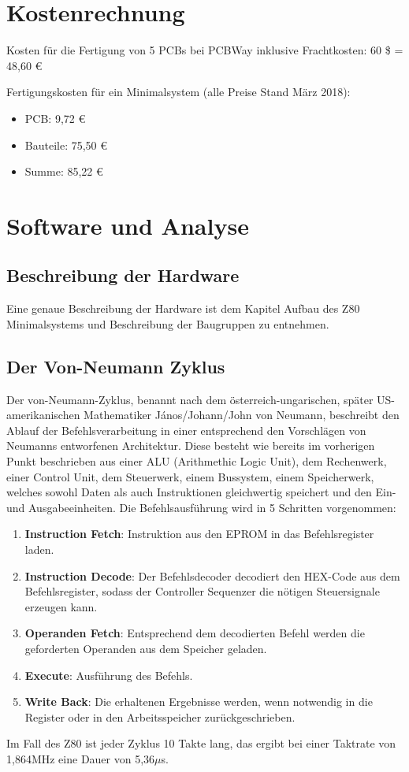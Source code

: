 \section{Kostenrechnung}
\label{sec:z80-kostenrechnung}
Kosten für die Fertigung von 5 PCBs bei PCBWay inklusive Frachtkosten:
60 \$ = 48,60 €

Fertigungskosten für ein Minimalsystem (alle Preise Stand März 2018):
\begin{itemize}
    \item PCB: 9,72 €
    \item Bauteile: 75,50 €
    \item Summe: 85,22 €
\end{itemize}

\section{Software und Analyse}
\label{sec:z80-software}
\subsection{Beschreibung der Hardware}
Eine genaue Beschreibung der Hardware ist dem Kapitel Aufbau des Z80 Minimalsystems und Beschreibung der Baugruppen zu entnehmen.

\subsection{Der Von-Neumann Zyklus}
Der von-Neumann-Zyklus, benannt nach dem österreich-ungarischen, später US-amerikanischen Mathematiker János/Johann/John von Neumann, beschreibt den Ablauf der Befehlsverarbeitung in einer entsprechend den Vorschlägen von Neumanns entworfenen Architektur. Diese besteht wie bereits im vorherigen Punkt beschrieben aus einer ALU (Arithmethic Logic Unit), dem Rechenwerk, einer Control Unit, dem Steuerwerk, einem Bussystem, einem Speicherwerk, welches sowohl Daten als auch Instruktionen gleichwertig speichert und den Ein- und Ausgabeeinheiten. Die Befehlsausführung wird in 5 Schritten vorgenommen:

\begin{enumerate}
    \item \textbf{Instruction Fetch}: Instruktion aus den EPROM in das Befehlsregister laden.
    \item \textbf{Instruction Decode}: Der Befehlsdecoder decodiert den HEX-Code aus dem Befehlsregister, sodass der Controller Sequenzer die nötigen Steuersignale erzeugen kann.
    \item \textbf{Operanden Fetch}: Entsprechend dem decodierten Befehl werden die geforderten Operanden aus dem Speicher geladen.
    \item \textbf{Execute}: Ausführung des Befehls.
    \item \textbf{Write Back}: Die erhaltenen Ergebnisse werden, wenn notwendig in die Register oder in den Arbeitsspeicher zurückgeschrieben.
\end{enumerate}
Im Fall des Z80 ist jeder Zyklus 10 Takte lang, das ergibt bei einer Taktrate von 1,864MHz eine Dauer von 5,36$\mu$s.

